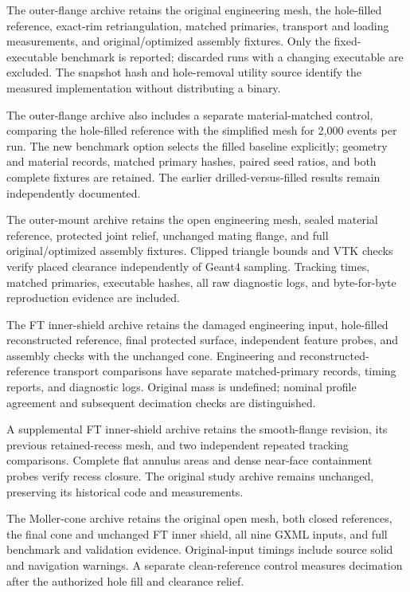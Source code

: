 The outer-flange archive retains the original engineering mesh, the hole-filled reference, exact-rim
retriangulation, matched primaries, transport and loading measurements, and original/optimized assembly
fixtures. Only the fixed-executable benchmark is reported; discarded runs with a changing executable are
excluded. The snapshot hash and hole-removal utility source identify the measured implementation without
distributing a binary.

The outer-flange archive also includes a separate material-matched control, comparing the hole-filled
reference with the simplified mesh for 2,000 events per run. The new benchmark option selects the filled
baseline explicitly; geometry and material records, matched primary hashes, paired seed ratios, and both
complete fixtures are retained. The earlier drilled-versus-filled results remain independently documented.

The outer-mount archive retains the open engineering mesh, sealed material reference, protected joint
relief, unchanged mating flange, and full original/optimized assembly fixtures. Clipped triangle bounds and
VTK checks verify placed clearance independently of Geant4 sampling. Tracking times, matched primaries,
executable hashes, all raw diagnostic logs, and byte-for-byte reproduction evidence are included.

The FT inner-shield archive retains the damaged engineering input, hole-filled reconstructed reference,
final protected surface, independent feature probes, and assembly checks with the unchanged cone.
Engineering and reconstructed-reference transport comparisons have separate matched-primary records, timing
reports, and diagnostic logs. Original mass is undefined; nominal profile agreement and subsequent
decimation checks are distinguished.

A supplemental FT inner-shield archive retains the smooth-flange revision, its previous retained-recess
mesh, and two independent repeated tracking comparisons. Complete flat annulus areas and dense near-face
containment probes verify recess closure. The original study archive remains unchanged, preserving its
historical code and measurements.

The Moller-cone archive retains the original open mesh, both closed references, the final cone and unchanged
FT inner shield, all nine GXML inputs, and full benchmark and validation evidence. Original-input timings
include source solid and navigation warnings. A separate clean-reference control measures decimation after
the authorized hole fill and clearance relief.

